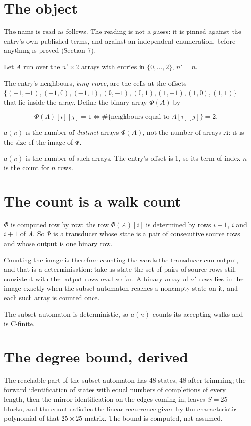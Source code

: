 \documentclass[11pt]{article}
\theoremstyle{definition}
\begin{document}
\section{The object}

The name is read as follows. The reading is not a guess: it is pinned against the entry's own published terms, and against an independent enumeration, before anything is proved (Section 7).

Let $A$ run over the $n' \times 2$ arrays with entries in $\{0,\dots,2\}$, $n' = n$.

The entry's neighbours, {\itshape king-move}, are the cells at the offsets $\{(-1,-1), (-1,0), (-1,1), (0,-1), (0,1), (1,-1), (1,0), (1,1)\}$ that lie inside the array. Define the binary array $\Phi(A)$ by

\[\Phi(A)[i][j] = 1 \iff \#\{\text{neighbours equal to } A[i][j]\} = 2.\]

$a(n)$ is the number of {\itshape distinct} arrays $\Phi(A)$, not the number of arrays $A$: it is the size of the image of $\Phi$.

$a(n)$ is the number of such arrays. The entry's offset is 1, so its term of index $n$ is the count for $n$ rows.

\section{The count is a walk count}

$\Phi$ is computed row by row: the row $\Phi(A)[i]$ is determined by rows $i-1$, $i$ and $i+1$ of $A$. So $\Phi$ is a transducer whose state is a pair of consecutive source rows and whose output is one binary row.

Counting the image is therefore counting the words the transducer can output, and that is a determinisation: take as state the set of pairs of source rows still consistent with the output rows read so far. A binary array of $n'$ rows lies in the image exactly when the subset automaton reaches a nonempty state on it, and each such array is counted once.

The subset automaton is deterministic, so $a(n)$ counts its accepting walks and is C-finite.

\section{The degree bound, derived}

The reachable part of the subset automaton has $48$ states, $48$ after trimming; the forward identification of states with equal numbers of completions of every length, then the mirror identification on the edges coming in, leaves $S = 25$ blocks, and the count satisfies the linear recurrence given by the characteristic polynomial of that $25\times25$ matrix. The bound is computed, not assumed.
\end{document}
